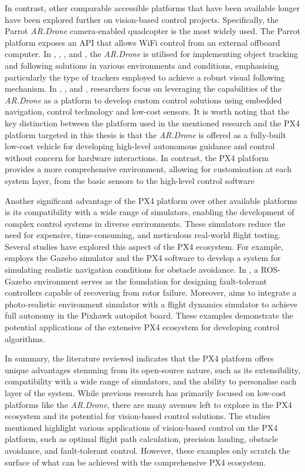 In contrast, other comparable accessible platforms that have been available longer have been explored further on vision-based control projects. Specifically, the Parrot \emph{AR.Drone} camera-enabled quadcopter is the most widely used. The Parrot platform exposes an API that allows WiFi control from an external offboard computer.
In \cite{bartak2015}, \cite{chakrabarty2016}, \cite{pestana2013}, and \cite{haag2015}, the \emph{AR.Drone} is utilised for implementing object tracking and following solutions in various environments and conditions, emphasising particularly the type of trackers employed to achieve a robust visual following mechanism. 
In \cite{hernandez2013}, \cite{lugo2014}, and \cite{bristeau2011}, researchers focus on leveraging the capabilities of the \emph{AR.Drone} as a platform to develop custom control solutions using embedded navigation, control technology and low-cost sensors. It is worth noting that the key distinction between the platform used in the mentioned research and the PX4 platform targeted in this thesis is that the \emph{AR.Drone} is offered as a fully-built low-cost vehicle for developing high-level autonomous guidance and control without concern for hardware interactions. In contrast, the PX4 platform provides a more comprehensive environment, allowing for customisation at each system layer, from the basic sensors to the high-level control software

Another significant advantage of the PX4 platform over other available platforms is its compatibility with a wide range of simulators, enabling the development of complex control systems in diverse environments. These simulators reduce the need for expensive, time-consuming, and meticulous real-world flight testing. Several studies have explored this aspect of the PX4 ecosystem. 
For example, \cite{garcia2022} employs the Gazebo simulator and the PX4 software to develop a system for simulating realistic navigation conditions for obstacle avoidance.
In \cite{chen2022}, a ROS-Gazebo environment serves as the foundation for designing fault-tolerant controllers capable of recovering from rotor failure. 
Moreover, \cite{huynh2022} aims to integrate a photo-realistic environment simulator with a flight dynamics simulator to achieve full autonomy in the Pixhawk autopilot board. 
These examples demonstrate the potential applications of the extensive PX4 ecosystem for developing control algorithms.


In summary, the literature reviewed indicates that the PX4 platform offers unique advantages stemming from its open-source nature, such as its extensibility, compatibility with a wide range of simulators, and the ability to personalise each layer of the system. While previous research has primarily focused on low-cost platforms like the \emph{AR.Drone}, there are many avenues left to explore in the PX4 ecosystem and its potential for vision-based control solutions. The studies mentioned highlight various applications of vision-based control on the PX4 platform, such as optimal flight path calculation, precision landing, obstacle avoidance, and fault-tolerant control. However, these examples only scratch the surface of what can be achieved with the comprehensive PX4 ecosystem.


